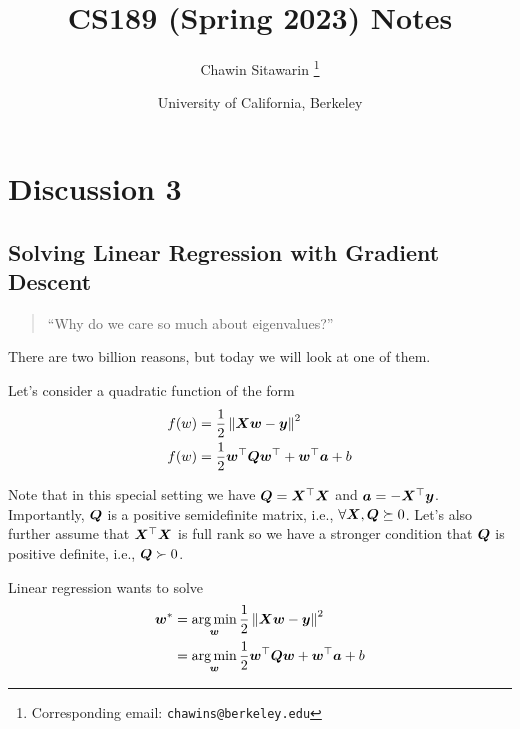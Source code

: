 \documentclass{article}
\title{CS189 (Spring 2023) Notes}
\author{
    Chawin Sitawarin \thanks{Corresponding email: \texttt{chawins@berkeley.edu}}
}
\date{
    University of California, Berkeley
}
\theoremstyle{plain}
\theoremstyle{definition}
\theoremstyle{remark}
\newcommand{\norm}[1]{\left\lVert#1\right\rVert}
\begin{document}
\maketitle



\section{Discussion 3}

\subsection{Solving Linear Regression with Gradient Descent}

\begin{quote}
    ``Why do we care so much about eigenvalues?''
\end{quote}

There are two billion reasons, but today we will look at one of them.

Let's consider a quadratic function of the form
\begin{align}
    f(w) & = \frac{1}{2} \norm{\mX \vw - \vy}^2          \\
    f(w) & = \frac{1}{2} \vw\T \mQ \vw\T + \vw\T \va + b
\end{align}

Note that in this special setting we have ${\bm{Q}} = {\bm{X}}{^{\top}} {\bm{X}}$ and ${\bm{a}} = -{\bm{X}}{^{\top}} {\bm{y}}$.
%
Importantly, ${\bm{Q}}$ is a positive semidefinite matrix, i.e., $\forall {\bm{X}}, {\bm{Q}} \succeq 0$.
%
Let's also further assume that ${\bm{X}}{^{\top}} {\bm{X}}$ is full rank so we have a stronger condition that ${\bm{Q}}$ is positive definite, i.e., ${\bm{Q}} \succ 0$.

Linear regression wants to solve
\begin{align}
    \vw^* & = \argmin_{\vw} \frac{1}{2} \norm{\mX \vw - \vy}^2        \\
          & = \argmin_{\vw} \frac{1}{2} \vw\T \mQ \vw + \vw\T \va + b
\end{align}
\end{document}
